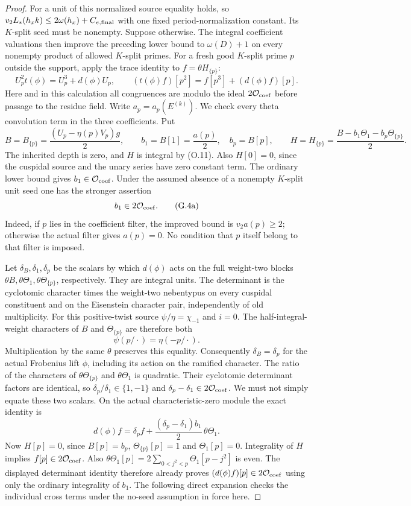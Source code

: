 \documentclass[11pt]{article}
\theoremstyle{definition}
\theoremstyle{remark}
\begin{document}
\begin{proof}
For a unit of this normalized source equality holds, so
$v_2L_*(h_xk)\le2\omega(h_x)+C_{e,\rm final}$ with one fixed
period-normalization constant.
Its $K$-split seed must be nonempty. Suppose otherwise. The integral
coefficient valuations then improve the preceding lower bound to
$\omega(D)+1$ on every nonempty product of allowed $K$-split primes.
For a fresh good $K$-split prime $p$ outside the support, apply the
trace identity to $f=\theta H_{\{p\}}$:
\[
 U_p^2t(\phi)=U_p^3+d(\phi)U_p,\qquad
 (t(\phi)f)[p^2]=f[p^3]+(d(\phi)f)[p].
\]
Here and in this calculation all congruences are modulo the ideal
$2\mathcal O_{\rm coef}$ before passage to the residue field.
Write $a_p=a_p(E^{(k)})$.
We check every theta convolution term in the three coefficients.
Put
\[
 B=B_{\{p\}}=\frac{(U_p-\eta(p)V_p)g}{2},\qquad
 b_1=B[1]=\frac{a(p)}2,\quad b_p=B[p],\qquad
 H=H_{\{p\}}=\frac{B-b_1\Theta_1-b_p\Theta_{\{p\}}}{2}.
\]
The inherited depth is zero, and $H$ is integral by (O.11).
Also $H[0]=0$, since the cuspidal source and the unary series have
zero constant term.
The ordinary lower bound gives $b_1\in\mathcal O_{\rm coef}$.
Under the assumed absence of a nonempty $K$-split unit seed one
has the stronger assertion
\[
                         b_1\in2\mathcal O_{\rm coef}.          \tag{G.4a}
\]
Indeed, if $p$ lies in the coefficient filter, the improved bound is
$v_2a(p)\ge2$; otherwise the actual filter gives $a(p)=0$.
No condition that $p$ itself belong to that filter is imposed.

Let $\delta_B,\delta_1,\delta_p$ be the scalars by which $d(\phi)$
acts on the full weight-two blocks
$\theta B,\theta\Theta_1,\theta\Theta_{\{p\}}$, respectively.
They are integral units.  The determinant is the cyclotomic character
times the weight-two nebentypus on every cuspidal constituent and
on the Eisenstein character pair, independently of old multiplicity.
For this positive-twist source $\psi/\eta=\chi_{-1}$ and $i=0$.
The half-integral-weight characters of $B$ and $\Theta_{\{p\}}$
are therefore both
\[
                 \psi(p/\cdot)=\eta(-p/\cdot).
\]
Multiplication by the same $\theta$ preserves this equality.
Consequently $\delta_B=\delta_p$ for the actual Frobenius lift
$\phi$, including its action on the ramified character.  The ratio
of the characters of $\theta\Theta_{\{p\}}$ and
$\theta\Theta_1$ is quadratic.  Their cyclotomic determinant factors
are identical, so $\delta_p/\delta_1\in\{1,-1\}$ and
$\delta_p-\delta_1\in2\mathcal O_{\rm coef}$.  We must not simply
equate these two scalars.  On the actual characteristic-zero
module the exact identity is
\[
 d(\phi)f=\delta_p f+
       \frac{(\delta_p-\delta_1)b_1}{2}\,\theta\Theta_1.
\]
Now $H[p]=0$, since $B[p]=b_p$, $\Theta_{\{p\}}[p]=1$ and
$\Theta_1[p]=0$.  Integrality of $H$ implies $f[p]\in2\mathcal O_{\rm coef}$.
Also $\theta\Theta_1[p]=2\sum_{0<j^2<p}\Theta_1[p-j^2]$ is even.
The displayed determinant identity therefore already proves
$(d(\phi)f)[p]\in2\mathcal O_{\rm coef}$ using only the ordinary
integrality of $b_1$.  The following direct expansion checks the
individual cross terms under the no-seed assumption in force here.


\end{proof}
\end{document}
